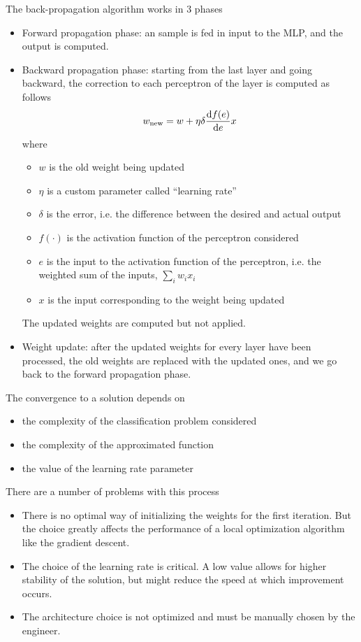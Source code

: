 \documentclass[oneside,onecolumn]{report}
\begin{document}
The back-propagation algorithm works in 3 phases
\begin{itemize}
    \item Forward propagation phase: an sample is fed in input to the MLP, and the output is computed.

    \item Backward propagation phase: starting from the last layer and going backward, the correction to each perceptron of the layer is computed as follows
    $$ w_\text{new} = w + \eta \delta \dv{f(e)}{e} x $$
    where
    \begin{itemize}
        \item $w$ is the old weight being updated
        \item $\eta$ is a custom parameter called ``learning rate''
        \item $\delta$ is the error, i.e. the difference between the desired and actual output
        \item $f(\cdot)$ is the activation function of the perceptron considered
        \item $e$ is the input to the activation function of the perceptron, i.e. the weighted sum of the inputs, $\sum_{i} w_i x_i$
        \item $x$ is the input corresponding to the weight being updated
    \end{itemize}

    The updated weights are computed but not applied.

    \item Weight update: after the updated weights for every layer have been processed, the old weights are replaced with the updated ones, and we go back to the forward propagation phase.
\end{itemize}

The convergence to a solution depends on
\begin{itemize}
    \item the complexity of the classification problem considered
    \item the complexity of the approximated function
    \item the value of the learning rate parameter
\end{itemize}

There are a number of problems with this process
\begin{itemize}
    \item There is no optimal way of initializing the weights for the first iteration. But the choice greatly affects the performance of a local optimization algorithm like the gradient descent.

    \item The choice of the learning rate is critical. A low value allows for higher stability of the solution, but might reduce the speed at which improvement occurs.

    \item The architecture choice is not optimized and must be manually chosen by the engineer.
\end{itemize}
\end{document}
